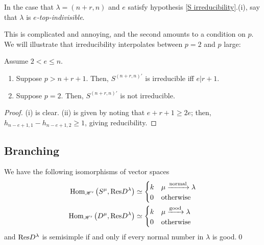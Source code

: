 \documentclass{amsart}
\begin{document}
In the case that $\lambda = (n+r,n)$ and $e$ satisfy hypothesis \eqref{S irreducibility}.(i), say that $\lambda$ is \emph{$e$-top-indivisible}.

This is complicated and annoying, and the second amounts to a condition on $p$.
We will illustrate that irreducibility interpolates between $p = 2$ and $p$ large:
\begin{corollary}
  Assume $2 < e \leq n$.
  \begin{enumerate}[label={(\roman*)}]
    \item Suppose $p > n + r + 1$. Then, $S^{(n + r,n)'}$ is irreducible iff $e | r + 1$.
    \item Suppose $p = 2$. Then, $S^{(n+r,n)'}$ is not irreducible.
  \end{enumerate}
\end{corollary}
\begin{proof}
  (i) is clear.
  (ii) is given by noting that $e + r + 1 \geq 2e$;
  then, $h_{n-e+1,1} - h_{n-e+1,2} \geq 1$, giving reducibility.
\end{proof}

\subsection{Branching}
\begin{theorem}
  We have the following isomorphisms of vector spaces
  \begin{align*}
    \text{Hom}_{\mathscr{H}'}\left( S^\mu,\text{Res} D^\lambda \right) 
    &\simeq \begin{cases}
      k & \mu \xrightarrow{\text{normal}} \lambda\\
      0 & \text{otherwise}
    \end{cases}\\
    \text{Hom}_{\mathscr{H}'}\left( D^\mu,\text{Res} D^\lambda \right) 
    &\simeq \begin{cases}
      k & \mu \xrightarrow{\text{good}} \lambda\\
      0 & \text{otherwise}
    \end{cases}
  \end{align*}
  and $\text{Res} D^\lambda$ is semisimple if and only if every normal number in $\lambda$ is good.\qed
\end{theorem}
\end{document}

